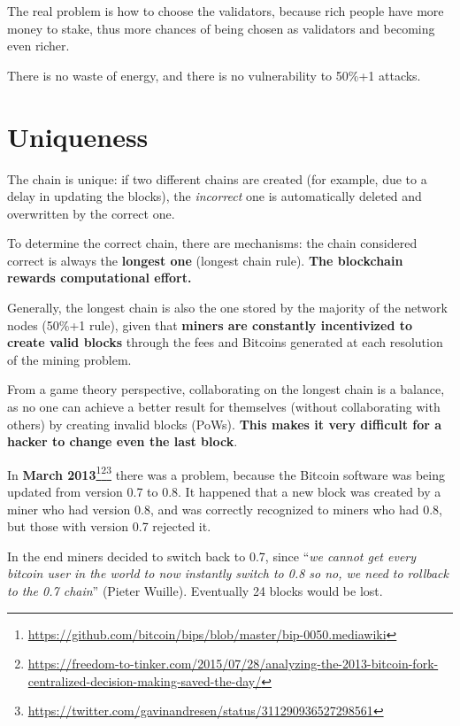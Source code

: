 The real problem is how to choose the validators, because rich people have more money to stake, thus more chances of being chosen as validators and becoming even richer.

There is no waste of energy, and there is no vulnerability to 50\%+1 attacks.

\section{Uniqueness}

The chain is unique: if two different chains are created (for example, due to a delay in updating the blocks), the \textit{incorrect} one is automatically deleted and overwritten by the correct one.

To determine the correct chain, there are mechanisms: the chain considered correct is always the \textbf{longest one} (longest chain rule). \textbf{The blockchain rewards computational effort.}

Generally, the longest chain is also the one stored by the majority of the network nodes (50\%+1 rule), given that \textbf{miners are constantly incentivized to create valid blocks} through the fees and Bitcoins generated at each resolution of the mining problem.

From a game theory perspective, collaborating on the longest chain is a balance, as no one can achieve a better result for themselves (without collaborating with others) by creating invalid blocks (PoWs). \textbf{This makes it very difficult for a hacker to change even the last block}.

In \textbf{March 2013}\footnote{\url{https://github.com/bitcoin/bips/blob/master/bip-0050.mediawiki}}\footnote{\url{https://freedom-to-tinker.com/2015/07/28/analyzing-the-2013-bitcoin-fork-centralized-decision-making-saved-the-day/}}\footnote{\url{https://twitter.com/gavinandresen/status/311290936527298561}} there was a problem, because the Bitcoin software was being updated from version 0.7 to 0.8. It happened that a new block was created by a miner who had version 0.8, and was correctly recognized to miners who had 0.8, but those with version 0.7 rejected it.

In the end miners decided to switch back to 0.7, since ``\emph{we cannot get every bitcoin user in the world to now instantly switch to 0.8 so no, we need to rollback to the 0.7 chain}'' (Pieter Wuille). Eventually 24 blocks would be lost.



